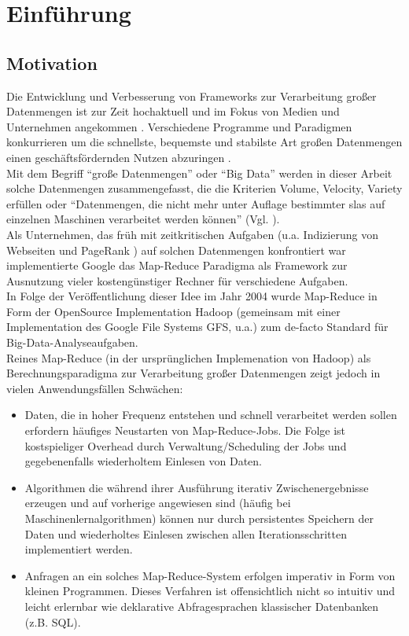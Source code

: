 \chapter{Einführung}

\section{Motivation}

Die Entwicklung und Verbesserung von Frameworks zur Verarbeitung großer Datenmengen ist zur Zeit hochaktuell und im Fokus von Medien und Unternehmen angekommen \cite{Bit14}. Verschiedene Programme und Paradigmen konkurrieren um die schnellste, bequemste und stabilste Art großen Datenmengen einen geschäftsfördernden Nutzen abzuringen \cite{Sin14}.\\

Mit dem Begriff "`große Datenmengen"' oder "`Big Data"' werden in dieser Arbeit solche Datenmengen zusammengefasst, die die Kriterien Volume, Velocity, Variety \cite{Lan01} erfüllen oder "`Datenmengen, die nicht mehr unter Auflage bestimmter \gls{sla}s auf einzelnen Maschinen verarbeitet werden können"' (Vgl. \cite{Sam14}).\\

Als Unternehmen, das früh mit zeitkritischen Aufgaben (u.a.  Indizierung von Webseiten und PageRank \cite{page2001method}) auf solchen Datenmengen konfrontiert war implementierte Google das Map-Reduce Paradigma \cite{Dean04} als Framework zur Ausnutzung vieler kostengünstiger Rechner für verschiedene Aufgaben. \\

In Folge der Veröffentlichung dieser Idee im Jahr 2004 wurde Map-Reduce in Form der OpenSource Implementation Hadoop (gemeinsam mit einer Implementation des Google File Systems GFS, u.a.) \cite{Ghema03} zum de-facto Standard für Big-Data-Analyseaufgaben.\\

Reines Map-Reduce (in der ursprünglichen Implemenation von Hadoop) als Berechnungsparadigma zur Verarbeitung großer Datenmengen zeigt jedoch in vielen Anwendungsfällen Schwächen:
\begin{itemize}
	\item Daten, die in hoher Frequenz entstehen und schnell verarbeitet werden sollen erfordern häufiges Neustarten von Map-Reduce-Jobs. Die Folge ist kostspieliger Overhead durch Verwaltung/Scheduling der Jobs und gegebenenfalls wiederholtem Einlesen von Daten.
	\item Algorithmen die während ihrer Ausführung iterativ Zwischenergebnisse erzeugen und auf vorherige angewiesen sind (häufig bei Maschinenlernalgorithmen) können nur durch persistentes Speichern der Daten und wiederholtes Einlesen zwischen allen Iterationsschritten implementiert werden.
	\item Anfragen an ein solches Map-Reduce-System erfolgen imperativ in Form von kleinen Programmen. Dieses Verfahren ist offensichtlich nicht so intuitiv und leicht erlernbar wie deklarative Abfragesprachen klassischer Datenbanken (z.B. SQL).
\end{itemize}

